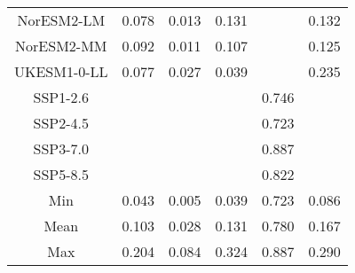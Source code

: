 \begin{table*}[t]
\begin{tabular}{c|rrr|rr}
NorESM2-LM & 0.078 & 0.013 & 0.131 &  & 0.132 \\
NorESM2-MM & 0.092 & 0.011 & 0.107 &  & 0.125 \\
UKESM1-0-LL & 0.077 & 0.027 & 0.039 &  & 0.235 \\
SSP1-2.6 &  &  &  & 0.746 &  \\
SSP2-4.5 &  &  &  & 0.723 &  \\
SSP3-7.0 &  &  &  & 0.887 &  \\
SSP5-8.5 &  &  &  & 0.822 &  \\
\midrule
Min & 0.043 & 0.005 & 0.039 & 0.723 & 0.086 \\
Mean & 0.103 & 0.028 & 0.131 & 0.780 & 0.167 \\
Max & 0.204 & 0.084 & 0.324 & 0.887 & 0.290 \\
\bottomrule
\end{tabular}
\end{table*}
